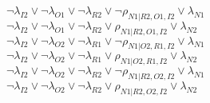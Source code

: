 $\neg\lambda_{I2} \vee \neg\lambda_{O1} \vee \neg\lambda_{R2} \vee \neg\rho_{N1|R2,O1,I2} \vee \lambda_{N1}$\\
$\neg\lambda_{I2} \vee \neg\lambda_{O1} \vee \neg\lambda_{R2} \vee \rho_{N1|R2,O1,I2} \vee \lambda_{N2}$\\
$\neg\lambda_{I2} \vee \neg\lambda_{O2} \vee \neg\lambda_{R1} \vee \neg\rho_{N1|O2,R1,I2} \vee \lambda_{N1}$\\
$\neg\lambda_{I2} \vee \neg\lambda_{O2} \vee \neg\lambda_{R1} \vee \rho_{N1|O2,R1,I2} \vee \lambda_{N2}$\\
$\neg\lambda_{I2} \vee \neg\lambda_{O2} \vee \neg\lambda_{R2} \vee \neg\rho_{N1|R2,O2,I2} \vee \lambda_{N1}$\\
$\neg\lambda_{I2} \vee \neg\lambda_{O2} \vee \neg\lambda_{R2} \vee \rho_{N1|R2,O2,I2} \vee \lambda_{N2}$\\
